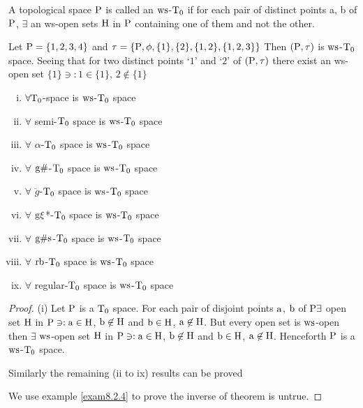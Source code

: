 \begin{dfn}\label{defi8.2.1}
A topological space $\mathrm{P}$ is called an $\mathrm{ws}$-$\mathrm{T}_{0}$ if for each pair of distinct points a, b of $\mathrm{P}$, $\exists$ an ws-open sets $\mathrm{H}$ in $\mathrm{P}$ containing one of them and not the other.
\end{dfn}

\begin{exm}\label{exam8.2.2}
Let $\mathrm{P}= \{1, 2, 3, 4\}$ and $\tau =\{\mathrm{P}, \phi, \{1\},\{2\},\{1,2\},\{1,2,3\}\}$ Then $(\mathrm{P}, \tau)$ is $\mathrm{ws}$-$\mathrm{T}_{0}$ space. Seeing that for two distinct points `$1$' and `$2$' of $(\mathrm{P}, \tau)$ there exist an ws-open set $\{1\} \ni: 1 \in \{1\}$, $2 \not\in \{1\}$
\end{exm}

\begin{thm}\label{thm8.2.3}
\begin{enumerate}[(i)]
\item $\forall \mathrm{T}_{0}$-space is $\mathrm{ws}$-$\mathrm{T}_{0}$ space
\item $\forall$ semi-$\mathrm{T}_{0}$ space is $\mathrm{ws}$-$\mathrm{T}_{0}$ space
\item $\forall$ $\alpha$-$\mathrm{T}_{0}$ space is $\mathrm{ws}$-$\mathrm{T}_{0}$ space
\item $\forall$ $\mathrm{g}\#$-$\mathrm{T}_{0}$ space is $\mathrm{ws}$-$\mathrm{T}_{0}$ space
\item $\forall$ $\ddot{g}$-$\mathrm{T}_{0}$ space is $\mathrm{ws}$-$\mathrm{T}_{0}$ space
\item $\forall$ $\mathrm{g}\xi$*-$\mathrm{T}_{0}$ space is $\mathrm{ws}$-$\mathrm{T}_{0}$ space
\item $\forall$ $\mathrm{g}\#\mathrm{s}$-$\mathrm{T}_{0}$ space is $\mathrm{ws}$-$\mathrm{T}_{0}$ space
\item $\forall$ $\mathrm{rb}$-$\mathrm{T}_{0}$ space is $\mathrm{ws}$-$\mathrm{T}_{0}$ space
\item $\forall$ regular-$\mathrm{T}_{0}$ space is $\mathrm{ws}$-$\mathrm{T}_{0}$ space
\end{enumerate}
\end{thm}

\begin{proof}
(i) Let $\mathrm{P}$ is a $\mathrm{T}_{0}$ space. For each pair of disjoint points $\mathrm{a}$, $\mathrm{b}$ of $\mathrm{P} \exists$ open set $\mathrm{H}$ in $\mathrm{P} \ni: \mathrm{a} \in \mathrm{H}$, $\mathrm{b} \not\in \mathrm{H}$ and $\mathrm{b} \in \mathrm{H}$, $\mathrm{a} \not\in \mathrm{H}$. But every open set is $\mathrm{ws}$-open then $\exists$ $\mathrm{ws}$-open set $\mathrm{H}$ in $\mathrm{P} \ni: \mathrm{a} \in \mathrm{H}$, $\mathrm{b} \not\in \mathrm{H}$ and $\mathrm{b}\in \mathrm{H}$, $\mathrm{a} \not\in \mathrm{H}$. Henceforth $\mathrm{P}$ is a $\mathrm{ws}$-$\mathrm{T}_{0}$ space.

Similarly the remaining (ii to ix) results can be proved

We use example \ref{exam8.2.4} to prove the inverse of theorem is untrue.
\end{proof}

